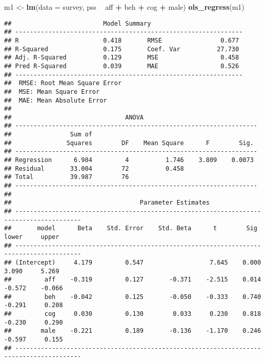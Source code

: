 \documentclass[]{article}
\newenvironment{Shaded}{\begin{snugshade}}{\end{snugshade}}
\newcommand{\KeywordTok}[1]{\textcolor[rgb]{0.13,0.29,0.53}{\textbf{#1}}}
\newcommand{\DataTypeTok}[1]{\textcolor[rgb]{0.13,0.29,0.53}{#1}}
\newcommand{\StringTok}[1]{\textcolor[rgb]{0.31,0.60,0.02}{#1}}
\newcommand{\OperatorTok}[1]{\textcolor[rgb]{0.81,0.36,0.00}{\textbf{#1}}}
\newcommand{\NormalTok}[1]{#1}
\begin{document}
\begin{Shaded}
\begin{Highlighting}[]
\NormalTok{m1 <-}\StringTok{ }\KeywordTok{lm}\NormalTok{(}\DataTypeTok{data =}\NormalTok{ survey, pss }\OperatorTok{~}\StringTok{ }\NormalTok{aff }\OperatorTok{+}\StringTok{ }\NormalTok{beh }\OperatorTok{+}\StringTok{ }\NormalTok{cog }\OperatorTok{+}\StringTok{ }\NormalTok{male)}
\KeywordTok{ols_regress}\NormalTok{(m1)}
\end{Highlighting}
\end{Shaded}

\begin{verbatim}
##                         Model Summary                          
## --------------------------------------------------------------
## R                       0.418       RMSE                0.677 
## R-Squared               0.175       Coef. Var          27.730 
## Adj. R-Squared          0.129       MSE                 0.458 
## Pred R-Squared          0.039       MAE                 0.526 
## --------------------------------------------------------------
##  RMSE: Root Mean Square Error 
##  MSE: Mean Square Error 
##  MAE: Mean Absolute Error 
## 
##                               ANOVA                                
## ------------------------------------------------------------------
##                Sum of                                             
##               Squares        DF    Mean Square      F        Sig. 
## ------------------------------------------------------------------
## Regression      6.984         4          1.746    3.809    0.0073 
## Residual       33.004        72          0.458                    
## Total          39.987        76                                   
## ------------------------------------------------------------------
## 
##                                   Parameter Estimates                                    
## ----------------------------------------------------------------------------------------
##       model      Beta    Std. Error    Std. Beta      t        Sig      lower     upper 
## ----------------------------------------------------------------------------------------
## (Intercept)     4.179         0.547                  7.645    0.000     3.090     5.269 
##         aff    -0.319         0.127       -0.371    -2.515    0.014    -0.572    -0.066 
##         beh    -0.042         0.125       -0.050    -0.333    0.740    -0.291     0.208 
##         cog     0.030         0.130        0.033     0.230    0.818    -0.230     0.290 
##        male    -0.221         0.189       -0.136    -1.170    0.246    -0.597     0.155 
## ----------------------------------------------------------------------------------------
\end{verbatim}
\end{document}
